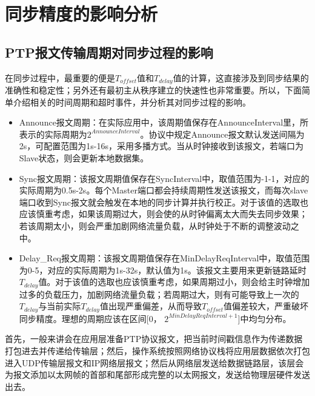 \section{同步精度的影响分析}
\subsection{PTP报文传输周期对同步过程的影响}
在同步过程中，最重要的便是$T_{offset}$值和$T_{delay}$值的计算，这直接涉及到同步结果的准确性和稳定性；另外还有最初主从秩序建立的快速性也非常重要。所以，下面简单介绍相关的时间周期和超时事件，并分析其对同步过程的影响。
\begin{itemize}[noitemsep,topsep=0pt,parsep=0pt,partopsep=0pt]
	\item Announce报文周期：在实际应用中，该周期值保存在AnnounceInterval里，所表示的实际周期为$2^{AnnounceInterval}$。协议中规定Announce报文默认发送间隔为2s，可配置范围为1s-16s，采用多播方式。当从时钟接收到该报文，若端口为Slave状态，则会更新本地数据集。
	\item Sync报文周期：该报文周期值保存在SyncInterval中，取值范围为-1-1，对应的实际周期为0.5s-2s。每个Master端口都会持续周期性发送该报文，而每次slave端口收到Sync报文就会触发在本地的同步计算并执行校正。对于该值的选取也应该慎重考虑，如果该周期过大，则会使的从时钟偏离太大而失去同步效果；若该周期太小，则会严重加剧网络流量负载，从时钟处于不断的调整波动之中。
	\item Delay\_Req报文周期：该报文周期值保存在MinDelayReqInterval中，取值范围为0-5，对应的实际周期为1s-32s，默认值为1s。该报文主要用来更新链路延时$T_{delay}$值。对于该值的选取也应该慎重考虑，如果周期过小，则会给主时钟增加过多的负载压力，加剧网络流量负载；若周期过大，则有可能导致上一次的$T_{delay}$与当前实际$T_{delay}$值出现严重偏差，从而导致$T_{offset}$值偏差较大，严重破坏同步精度。理想的周期应该在区间[0， $2^{MinDelayReqInterval+1}$]中均匀分布。
\end{itemize}

首先，一般来讲会在应用层准备PTP协议报文，把当前时间戳信息作为传递数据打包进去并传递给传输层；然后，操作系统按照网络协议栈将应用层数据依次打包进入UDP传输层报文和IP网络层报文；然后从网络层发送给数据链路层，该层会为报文添加以太网帧的首部和尾部形成完整的以太网报文，发送给物理层硬件发送出去\supercite{54}。


